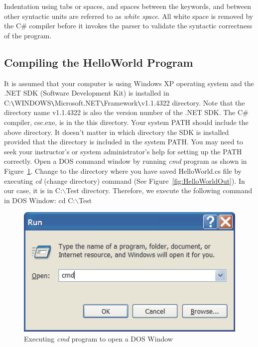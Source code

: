 Indentation using tabs or spaces, and spaces between the keywords,
and between other syntactic units are referred to as \emph{white
space}. All white space is removed by the C\# compiler before it
invokes the parser to validate the syntactic correctness of the
program.


\subsection{Compiling the HelloWorld Program}

It is assumed that your computer is using Windows XP operating
system and the .NET SDK (Software Development Kit) is installed in
C:\verb+\+WINDOWS\verb+\+Microsoft.NET\verb+\+Framework\verb+\+v1.1.4322
directory. Note that the directory name v1.1.4322 is also the
version number of the .NET SDK. The C\# compiler, csc.exe, is in
the this directory. Your system PATH should include the above
directory. It doesn't matter in which directory the SDK is
installed provided that the directory is included in the system
PATH. You may need to seek your instructor's or system
administrator's help for setting up the PATH correctly. Open a DOS
command window by running \emph{cmd} program as shown in
Figure~\ref{fig:CommandWindow}. Change to the directory where you
have saved HelloWorld.cs file by executing \emph{cd} (change
directory) command (See Figure~\ref{fig:HelloWorldOut}). In our
case, it is in C:$\backslash$Test directory. Therefore, we execute
the following command in DOS Window: cd C:$\backslash$Test


\begin{figure}
\centering
\includegraphics[scale=0.50]{./CSharpBasics/Illus/CommandWindow}
\caption{Executing \emph{cmd} program to open a DOS Window}
\label{fig:CommandWindow}
\end{figure}


